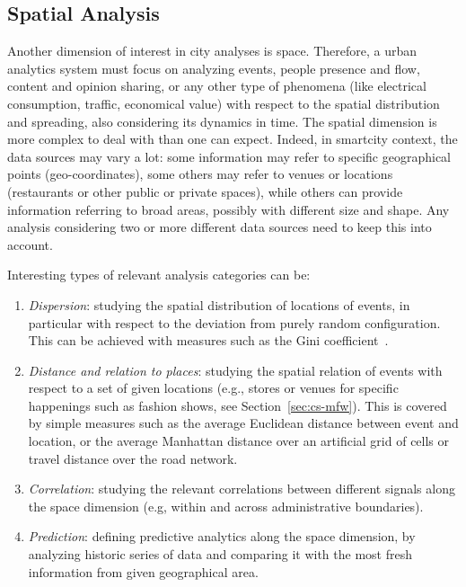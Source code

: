 \subsection{Spatial Analysis}
Another dimension of interest in city analyses is space. Therefore, a urban analytics system must focus on analyzing events, people presence and flow, content and opinion sharing, or any other type of phenomena (like electrical consumption, traffic, economical value) with respect to the spatial distribution and spreading, also considering its dynamics in time. 
The spatial dimension is more complex to deal with than one can expect. Indeed, in smartcity context, the data sources may vary a lot: some information may refer to specific geographical points (geo-coordinates), some others may refer to venues or locations (restaurants or other public or private spaces), while others can provide information referring  to broad areas, possibly with different size and shape. Any analysis considering two or more different data sources need to keep this into account.

Interesting types of relevant analysis categories can be:
\begin{enumerate}
\item \textit{Dispersion}: studying the spatial distribution of locations of events, in particular with respect to the deviation from purely random configuration. This can be achieved with measures such as the Gini coefficient~\cite{yitzhaki1983extension}.
\item \textit{Distance and relation to places}: studying the spatial relation of events with respect to a set of given locations (e.g., stores or venues for specific happenings such as fashion shows, see Section~\ref{sec:cs-mfw}). This is covered by simple measures such as the average Euclidean distance between event and location, or the average Manhattan distance over an artificial grid of cells or travel distance over the road network.
\item \textit{Correlation}: studying the relevant correlations between different signals along the space dimension (e.g, within and across administrative boundaries). 
\item \textit{Prediction}: defining predictive analytics along the space dimension, by analyzing historic series of data and comparing it with the most fresh information from given geographical area.
\end{enumerate}

